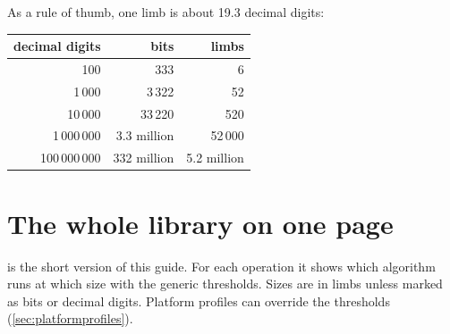 As a rule of thumb, one limb is about 19.3 decimal digits:

\begin{center}
\begin{tabular}{rrr}
\toprule
decimal digits & bits & limbs \\
\midrule
100 & 333 & 6 \\
1\,000 & 3\,322 & 52 \\
10\,000 & 33\,220 & 520 \\
1\,000\,000 & 3.3 million & 52\,000 \\
100\,000\,000 & 332 million & 5.2 million \\
\bottomrule
\end{tabular}
\end{center}

\section{The whole library on one page}
\label{sec:onepage}

 is the short version of this guide. For each operation it shows
which algorithm runs at which size with the generic thresholds. Sizes are in
limbs unless marked as bits or decimal digits. Platform profiles can override the thresholds
(\cref{sec:platformprofiles}).

